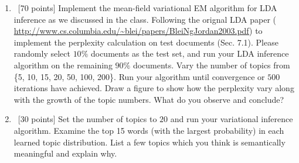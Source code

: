 \documentclass[12pt, fullpage,letterpaper]{article}
\begin{document}
\begin{enumerate}
	\begin{enumerate}
		\item~[70 points] Implement the mean-field variational EM algorithm for LDA inference as we discussed in the class. Following the orignal LDA paper ( \url{http://www.cs.columbia.edu/~blei/papers/BleiNgJordan2003.pdf}) to implement the perplexity calculation on test documents (Sec. 7.1). Please randomly select $10\%$ documents as the test set, and run your LDA inference algorithm on the remaining $90\%$ documents. Vary the number of topics from \{5, 10, 15, 20, 50, 100, 200\}. Run your algorithm until convergence or $500$ iterations have achieved. Draw a figure to show how the perplexity vary along with the growth of the topic numbers. What do you observe and conclude?
		\item~[30 points] Set the number of topics to $20$ and run your variational inference algorithm. Examine the top 15 words (\ie with the largest probability) in each learned topic distribution. List a few topics which you think is semantically meaningful and explain why. 
	\end{enumerate}
\end{enumerate}
\end{document}
